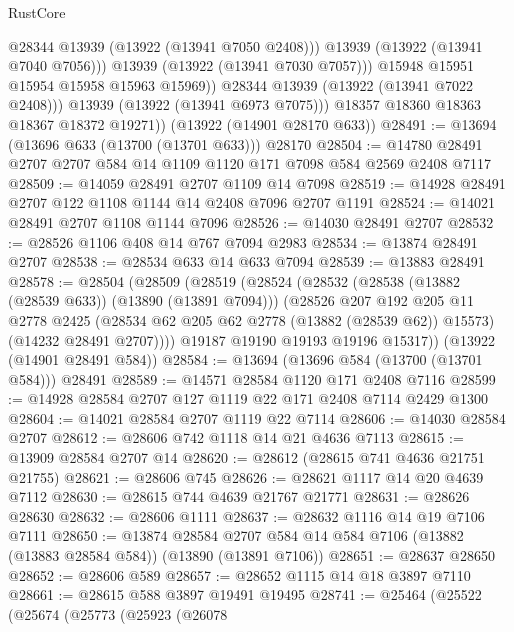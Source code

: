 \begin{lexlean}{RustCore}
\begin{coremodule}
                      @28344
                      @13939
                      (@13922 (@13941 @7050 @2408)))
                    @13939
                    (@13922 (@13941 @7040 @7056)))
                  @13939
                  (@13922 (@13941 @7030 @7057)))
                @15948
                @15951
                @15954
                @15958
                @15963
                @15969))
            @28344
            @13939
            (@13922 (@13941 @7022 @2408)))
          @13939
          (@13922 (@13941 @6973 @7075)))
        @18357
        @18360
        @18363
        @18367
        @18372
        @19271))
    (@13922 (@14901 @28170 @633))
@28491 := @13694 (@13696 @633 (@13700 (@13701 @633))) @28170
@28504 := @14780 @28491 @2707 @2707 @584 @14 @1109 @1120 @171 @7098 @584 @2569 @2408 @7117
@28509 := @14059 @28491 @2707 @1109 @14 @7098
@28519 := @14928 @28491 @2707 @122 @1108 @1144 @14 @2408 @7096 @2707 @1191
@28524 := @14021 @28491 @2707 @1108 @1144 @7096
@28526 := @14030 @28491 @2707
@28532 := @28526 @1106 @408 @14 @767 @7094 @2983
@28534 := @13874 @28491 @2707
@28538 := @28534 @633 @14 @633 @7094
@28539 := @13883 @28491
@28578 := @28504
    (@28509
      (@28519
        (@28524
          (@28532
            (@28538 (@13882 (@28539 @633)) (@13890 (@13891 @7094)))
            (@28526
              @207
              @192
              @205
              @11
              @2778
              @2425
              (@28534 @62 @205 @62 @2778 (@13882 (@28539 @62)) @15573)
              (@14232 @28491 @2707))))
        @19187
        @19190
        @19193
        @19196
        @15317))
    (@13922 (@14901 @28491 @584))
@28584 := @13694 (@13696 @584 (@13700 (@13701 @584))) @28491
@28589 := @14571 @28584 @1120 @171 @2408 @7116
@28599 := @14928 @28584 @2707 @127 @1119 @22 @171 @2408 @7114 @2429 @1300
@28604 := @14021 @28584 @2707 @1119 @22 @7114
@28606 := @14030 @28584 @2707
@28612 := @28606 @742 @1118 @14 @21 @4636 @7113
@28615 := @13909 @28584 @2707 @14
@28620 := @28612 (@28615 @741 @4636 @21751 @21755)
@28621 := @28606 @745
@28626 := @28621 @1117 @14 @20 @4639 @7112
@28630 := @28615 @744 @4639 @21767 @21771
@28631 := @28626 @28630
@28632 := @28606 @1111
@28637 := @28632 @1116 @14 @19 @7106 @7111
@28650 := @13874
    @28584
    @2707
    @584
    @14
    @584
    @7106
    (@13882 (@13883 @28584 @584))
    (@13890 (@13891 @7106))
@28651 := @28637 @28650
@28652 := @28606 @589
@28657 := @28652 @1115 @14 @18 @3897 @7110
@28661 := @28615 @588 @3897 @19491 @19495
@28741 := @25464
    (@25522
      (@25674
        (@25773
          (@25923
            (@26078

\end{coremodule}
\end{lexlean}
